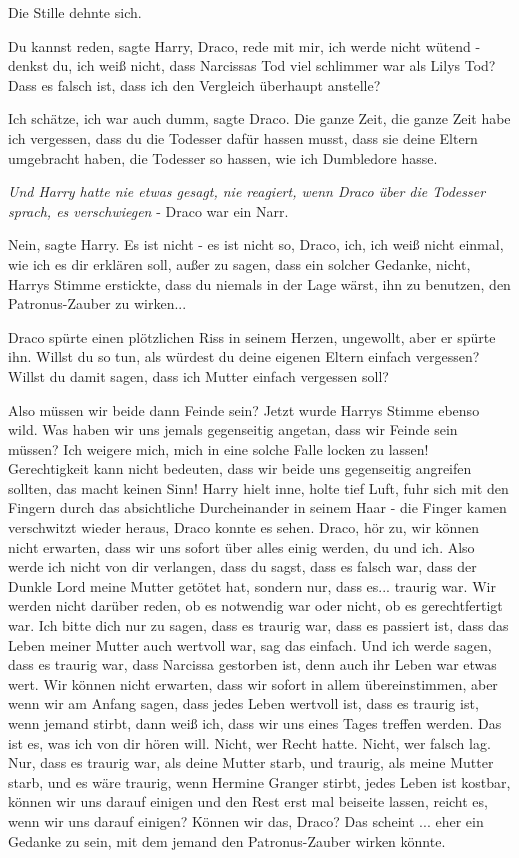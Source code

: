 Die Stille dehnte sich.

\glqq{}Du kannst reden\grqq{}, sagte Harry, \glqq{}Draco, rede mit mir, ich werde
nicht wütend - denkst du, ich weiß nicht, dass Narcissas Tod viel schlimmer war
als Lilys Tod? Dass es falsch ist, dass ich den Vergleich überhaupt
anstelle?\grqq{}

\glqq{}Ich schätze, ich war auch dumm\grqq{}, sagte Draco. \glqq{}Die ganze Zeit,
die ganze Zeit habe ich vergessen, dass du die Todesser dafür hassen musst, dass
sie deine Eltern umgebracht haben, die Todesser so hassen, wie ich Dumbledore
hasse.\grqq{}

\emph{Und Harry hatte nie etwas gesagt, nie reagiert, wenn Draco über die
Todesser sprach, es verschwiegen} - Draco war ein Narr.

\glqq{}Nein\grqq{}, sagte Harry. \glqq{}Es ist nicht - es ist nicht so, Draco,
ich, ich weiß nicht einmal, wie ich es dir erklären soll, außer zu sagen, dass
ein solcher Gedanke, nicht\grqq{}, Harrys Stimme erstickte, \glqq{}dass du
niemals in der Lage wärst, ihn zu benutzen, den Patronus-Zauber zu
wirken...\grqq{}

Draco spürte einen plötzlichen Riss in seinem Herzen, ungewollt, aber er spürte
ihn. \glqq{}Willst du so tun, als würdest du deine eigenen Eltern einfach
vergessen? Willst du damit sagen, dass ich Mutter einfach vergessen soll?\grqq{}

\glqq{}Also müssen wir beide dann Feinde sein?\grqq{} Jetzt wurde Harrys Stimme
ebenso wild. \glqq{}Was haben wir uns jemals gegenseitig angetan, dass wir Feinde
sein müssen? Ich weigere mich, mich in eine solche Falle locken zu lassen!
Gerechtigkeit kann nicht bedeuten, dass wir beide uns gegenseitig angreifen
sollten, das macht keinen Sinn!\grqq{} Harry hielt inne, holte tief Luft, fuhr
sich mit den Fingern durch das absichtliche Durcheinander in seinem Haar - die
Finger kamen verschwitzt wieder heraus, Draco konnte es sehen. \glqq{}Draco, hör
zu, wir können nicht erwarten, dass wir uns sofort über alles einig werden, du
und ich. Also werde ich nicht von dir verlangen, dass du sagst, dass es falsch
war, dass der Dunkle Lord meine Mutter getötet hat, sondern nur, dass es...
traurig war. Wir werden nicht darüber reden, ob es notwendig war oder nicht, ob
es gerechtfertigt war. Ich bitte dich nur zu sagen, dass es traurig war, dass es
passiert ist, dass das Leben meiner Mutter auch wertvoll war, sag das einfach.
Und ich werde sagen, dass es traurig war, dass Narcissa gestorben ist, denn auch
ihr Leben war etwas wert. Wir können nicht erwarten, dass wir sofort in allem
übereinstimmen, aber wenn wir am Anfang sagen, dass jedes Leben wertvoll ist,
dass es traurig ist, wenn jemand stirbt, dann weiß ich, dass wir uns eines Tages
treffen werden. Das ist es, was ich von dir hören will. Nicht, wer Recht hatte.
Nicht, wer falsch lag. Nur, dass es traurig war, als deine Mutter starb, und
traurig, als meine Mutter starb, und es wäre traurig, wenn Hermine Granger
stirbt, jedes Leben ist kostbar, können wir uns darauf einigen und den Rest erst
mal beiseite lassen, reicht es, wenn wir uns darauf einigen? Können wir das,
Draco? Das scheint ... eher ein Gedanke zu sein, mit dem jemand den
Patronus-Zauber wirken könnte.\grqq{}


